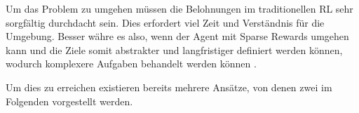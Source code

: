 Um das Problem zu umgehen müssen die Belohnungen im traditionellen RL sehr sorgfältig durchdacht sein. Dies erfordert viel Zeit und Verständnis für die Umgebung. Besser währe es also, wenn der Agent mit Sparse Rewards umgehen kann und die Ziele somit abstrakter und langfristiger definiert werden können, wodurch komplexere Aufgaben behandelt werden können \cite{hare2019dealing}.

Um dies zu erreichen existieren bereits mehrere Ansätze, von denen zwei im Folgenden vorgestellt werden.